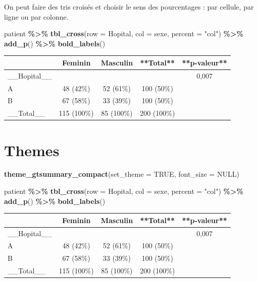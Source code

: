 \documentclass[
]{book}
\newenvironment{Shaded}{\begin{snugshade}}{\end{snugshade}}
\newcommand{\AttributeTok}[1]{\textcolor[rgb]{0.13,0.29,0.53}{#1}}
\newcommand{\ConstantTok}[1]{\textcolor[rgb]{0.56,0.35,0.01}{#1}}
\newcommand{\FunctionTok}[1]{\textcolor[rgb]{0.13,0.29,0.53}{\textbf{#1}}}
\newcommand{\NormalTok}[1]{#1}
\newcommand{\SpecialCharTok}[1]{\textcolor[rgb]{0.81,0.36,0.00}{\textbf{#1}}}
\newcommand{\StringTok}[1]{\textcolor[rgb]{0.31,0.60,0.02}{#1}}
\begin{document}
On peut faire des tris croisés et choisir le sens des pourcentages : par cellule,
par ligne ou par colonne.

\begin{Shaded}
\begin{Highlighting}[]
\NormalTok{patient }\SpecialCharTok{\%\textgreater{}\%}
  \FunctionTok{tbl\_cross}\NormalTok{(}\AttributeTok{row =}\NormalTok{ Hopital, }\AttributeTok{col =}\NormalTok{ sexe, }\AttributeTok{percent =} \StringTok{"col"}\NormalTok{) }\SpecialCharTok{\%\textgreater{}\%}
  \FunctionTok{add\_p}\NormalTok{() }\SpecialCharTok{\%\textgreater{}\%}
  \FunctionTok{bold\_labels}\NormalTok{()}
\end{Highlighting}
\end{Shaded}

\begin{tabular}{l|c|c|c|c}
\hline
 & Feminin & Masculin & **Total** & **p-valeur**\\
\hline
\_\_Hopital\_\_ &  &  &  & 0,007\\
\hline
A & 48 (42\%) & 52 (61\%) & 100 (50\%) & \\
\hline
B & 67 (58\%) & 33 (39\%) & 100 (50\%) & \\
\hline
\_\_Total\_\_ & 115 (100\%) & 85 (100\%) & 200 (100\%) & \\
\hline
\end{tabular}

\section{Themes}\label{themes}

\begin{Shaded}
\begin{Highlighting}[]
\FunctionTok{theme\_gtsummary\_compact}\NormalTok{(}\AttributeTok{set\_theme =} \ConstantTok{TRUE}\NormalTok{, }\AttributeTok{font\_size =} \ConstantTok{NULL}\NormalTok{)}

\NormalTok{patient }\SpecialCharTok{\%\textgreater{}\%}
  \FunctionTok{tbl\_cross}\NormalTok{(}\AttributeTok{row =}\NormalTok{ Hopital, }\AttributeTok{col =}\NormalTok{ sexe, }\AttributeTok{percent =} \StringTok{"col"}\NormalTok{) }\SpecialCharTok{\%\textgreater{}\%}
  \FunctionTok{add\_p}\NormalTok{() }\SpecialCharTok{\%\textgreater{}\%}
  \FunctionTok{bold\_labels}\NormalTok{()}
\end{Highlighting}
\end{Shaded}

\begin{tabular}{l|c|c|c|c}
\hline
 & Feminin & Masculin & **Total** & **p-valeur**\\
\hline
\_\_Hopital\_\_ &  &  &  & 0,007\\
\hline
A & 48 (42\%) & 52 (61\%) & 100 (50\%) & \\
\hline
B & 67 (58\%) & 33 (39\%) & 100 (50\%) & \\
\hline
\_\_Total\_\_ & 115 (100\%) & 85 (100\%) & 200 (100\%) & \\
\hline
\end{tabular}
\end{document}
